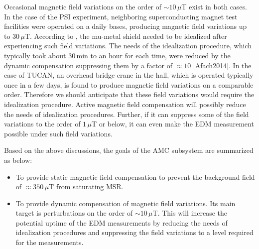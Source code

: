 Occasional magnetic field variations on the order of $\sim 10\,\mu$T exist in both cases. In the case of the PSI experiment, neighboring superconducting magnet test facilities were operated on a daily bases, producing magnetic field variations up to $30\,\mu$T. According to \cite{Afach2014}, the mu-metal shield needed to be idealized after experiencing such field variations. The needs of the idealization procedure, which typically took about 30\,min to an hour for each time, were reduced by the dynamic compensation suppressing them by a factor of $\approx10$ [Afach2014]. In the case of TUCAN, an overhead bridge crane in the hall, which is operated typically once in a few days, is found to produce magnetic field variations on a comparable order. Therefore we should anticipate that these field variations would require the idealization procedure. Active magnetic field compensation will possibly reduce the needs of idealization procedures. Further, if it can suppress some of the field variations to the order of $1\,\mu$T or below, it can even make the EDM measurement possible under such field variations.

Based on the above discussions, the goals of the AMC subsystem are summarized as below:
\begin{itemize}
  \item To provide static magnetic field compensation to prevent the background field of $\approx 350\,\mu$T from saturating MSR. 
  \item To provide dynamic compensation of magnetic field variations. Its main target is perturbations on the order of $\sim 10\,\mu$T. This will increase the potential uptime of the EDM measurements by reducing the needs of idealization procedures and suppressing the field variations to a level required for the measurements.
\end{itemize}


